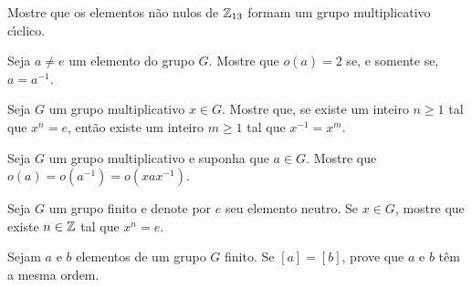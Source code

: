 \documentclass[12pt]{exam}
\begin{document}
    \vspace{.3cm}

    \questao{} Mostre que os elementos n\~ao nulos de $\mathbb{Z}_{13}$ formam um grupo multiplicativo c{\'\i}clico.

    \vspace{.3cm}

    \questao{} Seja $a \ne e$ um elemento do grupo $G$. Mostre que $o(a) = 2$ se, e somente se, $a = a^{-1}$.

    \vspace{.3cm}

    \questao{} Seja $G$ um grupo multiplicativo $x \in G$. Mostre que, se existe um inteiro $n \ge 1$ tal que $x^n = e$, ent\~ao existe um inteiro $m \ge 1$ tal que $x^{-1} = x^m$.

    \vspace{.3cm}

    \questao{} Seja $G$ um grupo multiplicativo e suponha que $a \in G$. Mostre que $o(a) = o(a^{-1}) = o(xax^{-1})$.

    \vspace{.3cm}

    \questao{} Seja $G$ um grupo finito e denote por $e$ seu elemento neutro. Se $x \in G$, mostre que existe $n \in \mathbb{Z}$ tal que $x^n = e$.

    \vspace{.3cm}

    \questao{} Sejam $a$ e $b$ elementos de um grupo $G$ finito. Se $[a] = [b]$, prove que $a$ e $b$ t\^em a mesma ordem.
\end{document}
